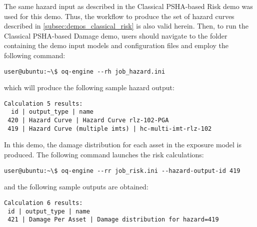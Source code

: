 The same hazard input as described in the Classical PSHA-based Risk demo was used for this demo. Thus, the workflow to produce the set of hazard curves described in \ref{subsec:demos_classical_risk} is also valid herein. Then, to run the Classical PSHA-based Damage demo, users should navigate to the folder containing the demo input models and configuration files and employ the following command:

\begin{Verbatim}[frame=single, commandchars=\\\{\}, samepage=true]
user@ubuntu:~\$ oq-engine --rh job_hazard.ini
\end{Verbatim}

which will produce the following sample hazard output:

\begin{Verbatim}[frame=single, commandchars=\\\{\}, samepage=true]
Calculation 5 results:
  id | output_type | name
 420 | Hazard Curve | Hazard Curve rlz-102-PGA
 419 | Hazard Curve (multiple imts) | hc-multi-imt-rlz-102
\end{Verbatim}

In this demo, the damage distribution for each asset in the exposure model is produced. The following command launches the risk calculations:

\begin{Verbatim}[frame=single, commandchars=\\\{\}, samepage=true]
user@ubuntu:~\$ oq-engine --rr job_risk.ini --hazard-output-id 419
\end{Verbatim}

and the following sample outputs are obtained:

\begin{Verbatim}[frame=single, commandchars=\\\{\}, samepage=true]
Calculation 6 results:
 id | output_type | name
 421 | Damage Per Asset | Damage distribution for hazard=419
\end{Verbatim}